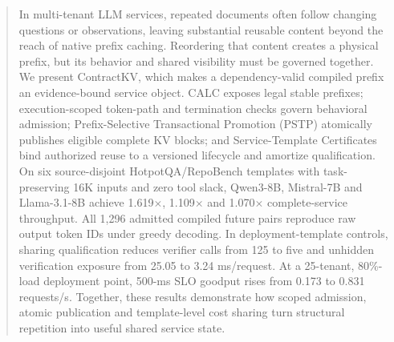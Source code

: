 \begin{abstract}
In multi-tenant LLM services, repeated documents often follow changing questions or observations, leaving substantial reusable content beyond the reach of native prefix caching. Reordering that content creates a physical prefix, but its behavior and shared visibility must be governed together. We present ContractKV, which makes a dependency-valid compiled prefix an evidence-bound service object. CALC exposes legal stable prefixes; execution-scoped token-path and termination checks govern behavioral admission; Prefix-Selective Transactional Promotion (PSTP) atomically publishes eligible complete KV blocks; and Service-Template Certificates bind authorized reuse to a versioned lifecycle and amortize qualification. On six source-disjoint HotpotQA/RepoBench templates with task-preserving 16K inputs and zero tool slack, Qwen3-8B, Mistral-7B and Llama-3.1-8B achieve 1.619$\times$, 1.109$\times$ and 1.070$\times$ complete-service throughput. All 1,296 admitted compiled future pairs reproduce raw output token IDs under greedy decoding. In deployment-template controls, sharing qualification reduces verifier calls from 125 to five and unhidden verification exposure from 25.05 to 3.24 ms/request. At a 25-tenant, 80\%-load deployment point, 500-ms SLO goodput rises from 0.173 to 0.831 requests/s. Together, these results demonstrate how scoped admission, atomic publication and template-level cost sharing turn structural repetition into useful shared service state.
\end{abstract}
